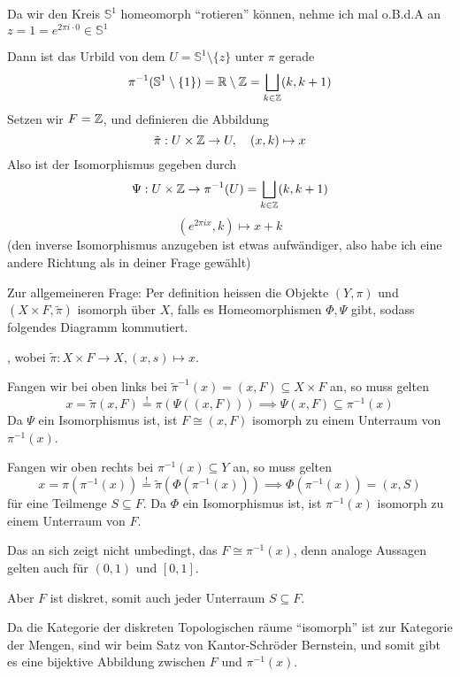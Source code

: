 Da wir den Kreis $\mathbb{S}^1$ homeomorph ``rotieren'' können, nehme ich mal o.B.d.A an $z = 1 = e^{2\pi i \cdot 0} \in \mathbb{S}^1$

Dann ist das Urbild von dem $U = \mathbb{S}^1 \setminus \{z\}$ unter $\pi$ gerade
$$
\pi^{-1}(\mathbb{S}^1 \setminus \{1\}) = \mathbb{R} \setminus \mathbb{Z} = \bigsqcup_{k \in \mathbb{Z}} (k,k+1)
$$
Setzen wir $F = \mathbb{Z}$, und definieren die Abbildung
$$
\tilde{\pi}: U\times \mathbb{Z}
\to U, \quad (x,k) \mapsto x
$$
Also ist der Isomorphismus gegeben durch
$$
\Psi: U \times \mathbb{Z} \to \pi^{-1}(U) = \bigsqcup_{k \in \mathbb{Z}}(k,k+1)
$$
$$
(e^{2 \pi i x},k) \mapsto x + k
$$
(den inverse Isomorphismus anzugeben ist etwas aufwändiger, also habe ich eine andere Richtung als in deiner Frage gewählt)


Zur allgemeineren Frage: Per definition heissen die Objekte $(Y,\pi)$ und $(X \times F, \tilde{\pi})$ isomorph über $X$, 
falls es Homeomorphismen $\Phi,\Psi$ gibt, sodass folgendes Diagramm kommutiert.
\begin{center}
\end{center}
, wobei
$
\tilde{\pi}: X \times F \to X, (x,s) \mapsto x
$.


Fangen wir bei oben links bei $\tilde{\pi}^{-1}(x) = (x,F) \subseteq X \times F$ an, so muss gelten
$$
x = \tilde{\pi}(x,F) \stackrel{!}{=} \pi(\Psi((x,F))) \implies \Psi(x,F) \subseteq \pi^{-1}(x)
$$
Da $\Psi$ ein Isomorphismus ist, ist $F \cong (x,F)$ isomorph zu einem Unterraum von $\pi^{-1}(x)$.

Fangen wir oben rechts bei $\pi^{-1}(x) \subseteq Y$ an, so muss gelten
$$
x = \pi( \pi^{-1}(x)) \stackrel{!}{=} \tilde{\pi}(\Phi(\pi^{-1}(x))) \implies \Phi(\pi^{-1}(x)) = (x,S)
$$
für eine Teilmenge $S \subseteq F$. Da $\Phi$ ein Isomorphismus ist, ist $\pi^{-1}(x)$ isomorph zu einem Unterraum von $F$.


Das an sich zeigt nicht umbedingt, das $F \cong \pi^{-1}(x)$, denn analoge Aussagen gelten auch für $(0,1)$ und $[0,1]$.

Aber $F$ ist diskret, somit auch jeder Unterraum $S \subseteq F$.

Da die Kategorie der diskreten Topologischen räume ``isomorph'' ist zur Kategorie der Mengen, sind wir beim Satz von Kantor-Schröder Bernstein, und somit gibt es eine bijektive Abbildung zwischen $F$ und $\pi^{-1}(x)$.

